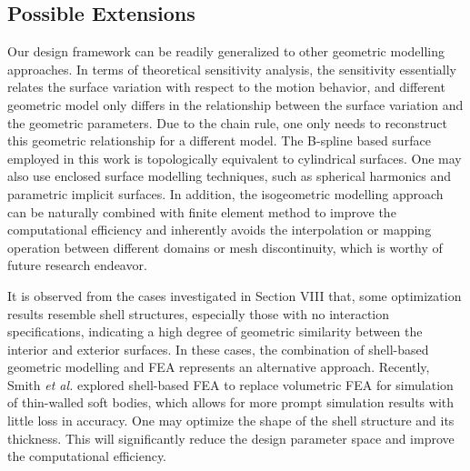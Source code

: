 \documentclass[journal]{IEEEtran}
\theoremstyle{definition}
\begin{document}
\subsection{Possible Extensions}
Our design framework can be readily generalized to other geometric modelling approaches. In terms of theoretical sensitivity analysis, the sensitivity essentially relates the surface variation with respect to the motion behavior, and different geometric model only differs in the relationship between the surface variation and the geometric parameters. Due to the chain rule, one only needs to reconstruct this geometric relationship for a different model. The B-spline based surface employed in this work is topologically equivalent to cylindrical surfaces. One may also use enclosed surface modelling techniques, such as spherical harmonics\cite{brechbuhler1995parametrization} and parametric implicit surfaces. In addition, the isogeometric modelling approach \cite{hughes2005isogeometric} can be naturally combined with finite element method to improve the computational efficiency and inherently avoids the interpolation or mapping operation between different domains or mesh discontinuity, which is worthy of future research endeavor.

It is observed from the cases investigated in Section VIII that, some optimization results resemble shell structures, especially those with no interaction specifications, indicating a high degree of geometric similarity between the interior and exterior surfaces. In these cases, the combination of shell-based geometric modelling and FEA represents an alternative approach. Recently, Smith \textit{et al.} explored shell-based FEA to replace volumetric FEA for simulation of thin-walled soft bodies, which allows for more prompt simulation results with little loss in accuracy\cite{smith2022stretching}. One may optimize the shape of the shell structure and its thickness. This will significantly reduce the design parameter space and improve the computational efficiency.
\end{document}
